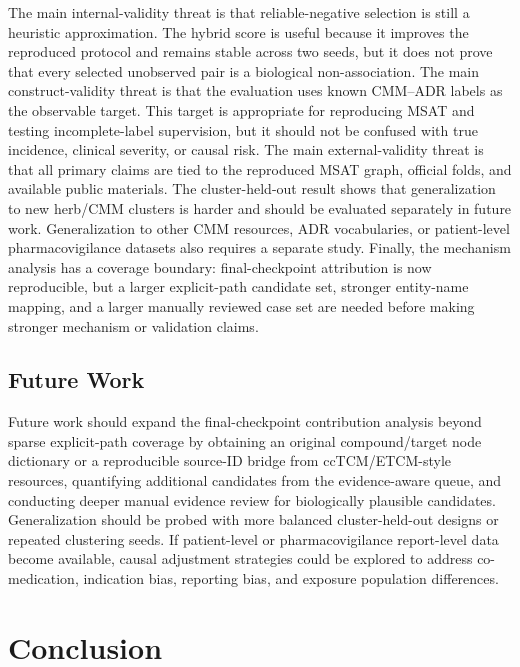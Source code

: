 \documentclass[manuscript,screen,review]{acmart}
\newcommand{\msat}{MSAT}
\begin{document}
The main internal-validity threat is that reliable-negative selection is still a heuristic approximation. The hybrid score is useful because it improves the reproduced protocol and remains stable across two seeds, but it does not prove that every selected unobserved pair is a biological non-association. The main construct-validity threat is that the evaluation uses known CMM--ADR labels as the observable target. This target is appropriate for reproducing \msat{} and testing incomplete-label supervision, but it should not be confused with true incidence, clinical severity, or causal risk. The main external-validity threat is that all primary claims are tied to the reproduced \msat{} graph, official folds, and available public materials. The cluster-held-out result shows that generalization to new herb/CMM clusters is harder and should be evaluated separately in future work. Generalization to other CMM resources, ADR vocabularies, or patient-level pharmacovigilance datasets also requires a separate study. Finally, the mechanism analysis has a coverage boundary: final-checkpoint attribution is now reproducible, but a larger explicit-path candidate set, stronger entity-name mapping, and a larger manually reviewed case set are needed before making stronger mechanism or validation claims.

\subsection{Future Work}

Future work should expand the final-checkpoint contribution analysis beyond sparse explicit-path coverage by obtaining an original compound/target node dictionary or a reproducible source-ID bridge from ccTCM/ETCM-style resources, quantifying additional candidates from the evidence-aware queue, and conducting deeper manual evidence review for biologically plausible candidates. Generalization should be probed with more balanced cluster-held-out designs or repeated clustering seeds. If patient-level or pharmacovigilance report-level data become available, causal adjustment strategies could be explored to address co-medication, indication bias, reporting bias, and exposure population differences.

\section{Conclusion}
\end{document}
